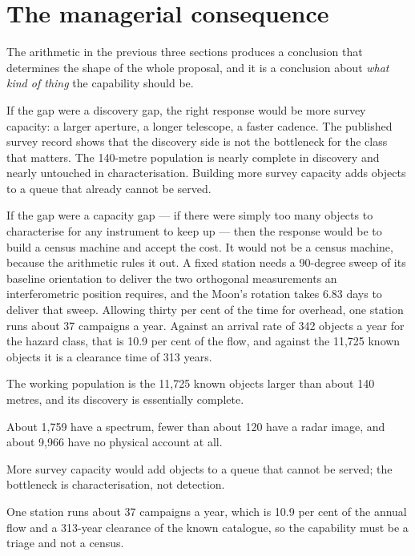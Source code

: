 \section{The managerial consequence}

The arithmetic in the previous three sections produces a conclusion that
determines the shape of the whole proposal, and it is a conclusion about
\emph{what kind of thing} the capability should be.

If the gap were a discovery gap, the right response would be more survey
capacity: a larger aperture, a longer telescope, a faster cadence. The
published survey record shows that the discovery side is not the bottleneck
for the class that matters. The 140-metre population is nearly complete in
discovery and nearly untouched in characterisation. Building more survey
capacity adds objects to a queue that already cannot be served.

If the gap were a capacity gap --- if there were simply too many objects to
characterise for any instrument to keep up --- then the response would be to
build a census machine and accept the cost. It would not be a census machine,
because the arithmetic rules it out. A fixed station needs a 90-degree sweep
of its baseline orientation to deliver the two orthogonal measurements an
interferometric position requires, and the Moon's rotation takes 6.83 days
to deliver that sweep. Allowing thirty per cent of the time for overhead, one
station runs about 37 campaigns a year. Against an arrival rate of 342
objects a year for the hazard class, that is 10.9 per cent of the flow, and
against the 11,725 known objects it is a clearance time of 313 years.

\begin{keytakeaways}
\item The working population is the 11,725 known objects larger than about
140 metres, and its discovery is essentially complete.
\item About 1,759 have a spectrum, fewer than about 120 have a radar image,
and about 9,966 have no physical account at all.
\item More survey capacity would add objects to a queue that cannot be served;
the bottleneck is characterisation, not detection.
\item One station runs about 37 campaigns a year, which is 10.9 per cent of
the annual flow and a 313-year clearance of the known catalogue, so the
capability must be a triage and not a census.
\end{keytakeaways}

